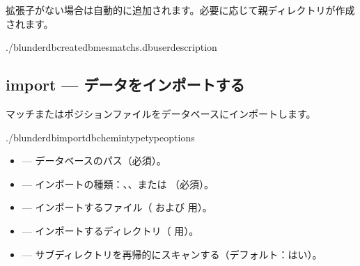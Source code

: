 \documentclass[letterpaper,10pt,dvipdfmx]{sphinxmanual}
\begin{document}
\sphinxAtStartPar
{} 拡張子がない場合は自動的に追加されます。必要に応じて親ディレクトリが作成されます。

\sphinxAtStartPar
{}

\begin{sphinxVerbatim}[commandchars=\\\{\}]
./blunderdbcreate\PYGZhy{}\PYGZhy{}dbmes\PYGZus{}matchs.db\PYGZhy{}\PYGZhy{}user\PYGZhy{}\PYGZhy{}description
\end{sphinxVerbatim}


\subsection{import — データをインポートする}
\label{\detokenize{cli:import-importer-des-donnees}}
\sphinxAtStartPar
マッチまたはポジションファイルをデータベースにインポートします。

\begin{sphinxVerbatim}[commandchars=\\\{\}]
./blunderdbimport\PYGZhy{}\PYGZhy{}db\PYGZlt{}chemin\PYGZgt{}\PYGZhy{}\PYGZhy{}type\PYGZlt{}type\PYGZgt{}\PYG{o}{[}options\PYG{o}{]}
\end{sphinxVerbatim}

\sphinxAtStartPar
{}
\begin{itemize}
\item {} 
\sphinxAtStartPar
{} — データベースのパス（必須）。

\item {} 
\sphinxAtStartPar
{} — インポートの種類：、、または （必須）。

\item {} 
\sphinxAtStartPar
{} — インポートするファイル（ および  用）。

\item {} 
\sphinxAtStartPar
{} — インポートするディレクトリ（ 用）。

\item {} 
\sphinxAtStartPar
{} — サブディレクトリを再帰的にスキャンする（デフォルト：はい）。

\end{itemize}
\end{document}
